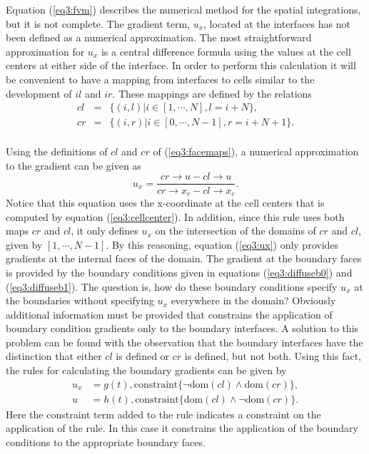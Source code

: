 \documentclass[10pt,epsf]{book}
\begin{document}
Equation (\ref{eq3:fvm}) describes the numerical method for
the spatial integrations, but it is not complete.  The gradient term,
$u_x$, located at the interfaces has not been defined as a numerical
approximation.  The most straightforward approximation for $u_x$ is a
central difference formula using the values at the cell centers at
either side of the interface.  In order to perform this calculation it
will be convenient to have a mapping from interfaces to cells similar to
the development of $il$ and $ir$.  These mappings are defined by
the relations
\begin{equation}
\begin{array}{rcl}
cl & = & \lbrace (i,l) | i \in [1, \cdots, N], l = i+N \rbrace,\\
cr & = & \lbrace (i,r) | i \in [0, \cdots, N-1], r = i+N+1 \rbrace.\\
\end{array}
\label{eq3:facemaps}
\end{equation}

Using the definitions of $cl$ and $cr$ of (\ref{eq3:facemaps}), a
numerical approximation to the gradient can be given as
\begin{equation}
  u_x = \frac{cr\rightarrow u - cl\rightarrow u}
{cr\rightarrow x_c - cl\rightarrow x_c}.
\label{eq3:ux}
\end{equation}
Notice that this equation uses the x-coordinate at the cell centers
that is computed by equation (\ref{eq3:cellcenter}).  In addition,
since this rule uses both maps $cr$ and $cl$, it only defines $u_x$ on
the intersection of the domains of $cr$ and $cl$, given by $[1, \cdots,
N-1]$.  By this reasoning, equation (\ref{eq3:ux}) only provides
gradients at the internal faces of the domain.  The gradient at the
boundary faces is provided by the boundary conditions given in
equations (\ref{eq3:diffuseb0}) and (\ref{eq3:diffuseb1}).  The
question is, how do these boundary conditions specify $u_x$ at the
boundaries without specifying $u_x$ everywhere in the domain?
Obviously additional information must be provided that constrains
the application of boundary condition gradients only to the boundary
interfaces.  A solution to this problem can be found with the
observation that the boundary interfaces have the distinction that
either $cl$ is defined or $cr$ is defined, but not both.  Using this
fact, the rules for calculating the boundary gradients can be given by
\begin{equation}
\begin{aligned}
u_x & = g(t), \mbox{constraint}\lbrace \neg \mathrm{dom}(cl) \wedge
\mathrm{dom}(cr) \rbrace, \label{eq3:brule0}\\
u & = h(t), \mbox{constraint}\lbrace \mathrm{dom}(cl)
\wedge \neg \mathrm{dom}(cr) \rbrace. %
\end{aligned}
\end{equation}
Here the constraint term added to the rule indicates a constraint on
the application of the rule.  In this case it constrains the
application of the boundary conditions to the appropriate boundary faces.
\end{document}
